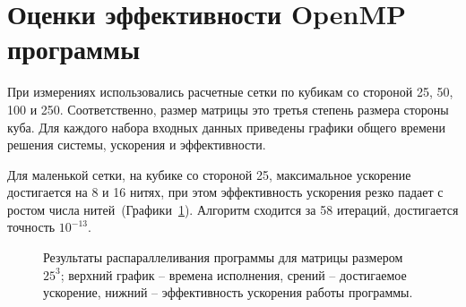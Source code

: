 \documentclass[12pt, oneside, a4paper]{article}
\begin{document}
\section{Оценки эффективности OpenMP программы}

При измерениях использовались расчетные сетки по кубикам со стороной 25, 50, 100 и 250. Соответственно, размер матрицы это третья степень размера стороны куба. Для каждого набора входных данных приведены графики общего времени решения системы, ускорения и эффективности.

Для маленькой сетки, на кубике со стороной 25, максимальное ускорение достигается на 8 и 16 нитях, при этом эффективность ускорения резко падает с ростом числа нитей~(Графики~\ref{fig:m25}). Алгоритм сходится за 58 итераций, достигается точность $10^{-13}$.

\begin{figure}[h!]
\caption{Результаты распараллеливания программы для матрицы размером $25^3$; верхний график -- времена исполнения, срений -- достигаемое ускорение, нижний -- эффективность ускорения работы программы.}
\label{fig:m25}
\end{figure}
\end{document}
